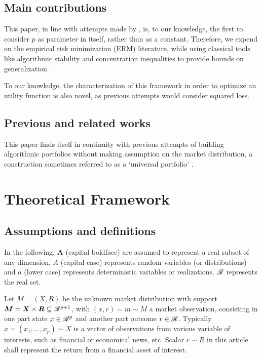 \documentclass{article}
\begin{document}
\subsection{Main contributions}

This paper, in line with attempts made by \cite{rudin2015big}, is, to our knowledge, the
first to consider $p$ as parameter in itself, rather than as a constant. Therefore, we
expend on the empirical risk minimization (ERM) literature, while using classical tools
like algorithmic stability and concentration inequalities to provide bounds on
generalization. 

To our knowledge, the characterization of this framework in order to optimize an utility
function is also novel, as previous attempts would consider squared loss.


\subsection{Previous and related works}

This paper finds itself in continuity with previous attempts of building algorithmic
portfolios without making assumption on the market distribution, a construction sometimes
referred to as a `universal portfolio' \cite{cover1991universal}.

\section{Theoretical Framework}

\subsection{Assumptions and definitions}


In the following, $\bm A$ (capital boldface) are assumed to represent a real subset of any
dimension, $A$ (capital case) represents random variables (or distributions) and $a$
(lower case) represents deterministic variables or realizations. $\mathscr{R}$ represents the
real set.

Let $M=(X,R)$ be the unknown market distribution with support
$\bm M = \bm X\times \bm R \subseteq\mathscr{R}^{p+1}$, with $(x,r) = m\sim M$ a market
observation, consisting in one part state $x\in\mathscr{R}^p$ and another part outcome
$r\in\mathscr{R}$. Typically $x=(x_1,\dots,x_p)\sim X$ is a vector of observations from various
variable of interests, such as financial or economical news, etc. Scalar $r\sim R$ in this
article shall represent the return from a financial asset of interest. 
\end{document}

